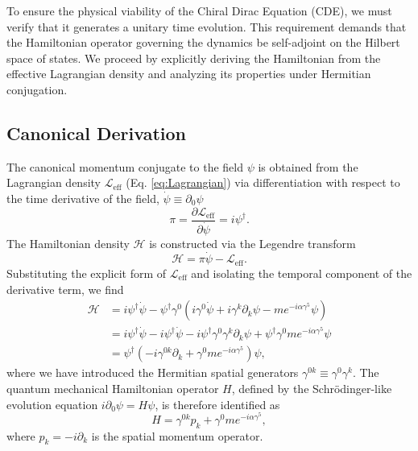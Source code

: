 To ensure the physical viability of the Chiral Dirac Equation (CDE), we must verify
that it generates a unitary time evolution. This requirement demands that the
Hamiltonian operator governing the dynamics be self-adjoint on the Hilbert space
of states. We proceed by explicitly deriving the Hamiltonian from the effective
Lagrangian density and analyzing its properties under Hermitian conjugation.

\subsection{Canonical Derivation}

The canonical momentum conjugate to the field $\psi$ is obtained from the
Lagrangian density $\mathcal{L}_{\text{eff}}$ (Eq. \ref{eq:Lagrangian}) via
differentiation with respect to the time derivative of the field, $\dot{\psi}
\equiv \partial_0 \psi$
\begin{equation}
	\pi = \frac{\partial \mathcal{L}_{\text{eff}}}{\partial \dot{\psi}} =
	i \psi^\dagger.
\end{equation}
The Hamiltonian density $\mathcal{H}$ is constructed via the Legendre transform
\begin{equation}
	\mathcal{H} = \pi \dot{\psi} - \mathcal{L}_{\text{eff}}.
\end{equation}
Substituting the explicit form of $\mathcal{L}_{\text{eff}}$ and isolating the
temporal component of the derivative term, we find
\begin{align}
	\mathcal{H} &= i \psi^\dagger \dot{\psi} - \psi^\dagger \gamma^0
	(i \gamma^0 \dot{\psi} + i \gamma^k \partial_k \psi - m e^{-i \alpha \gamma^5} \psi)
	\nonumber \\
							&= i \psi^\dagger \dot{\psi} - i \psi^\dagger \dot{\psi} - i \psi^\dagger \gamma^0
							\gamma^k \partial_k \psi + \psi^\dagger \gamma^0 m e^{-i \alpha \gamma^5} \psi
							\nonumber \\
							&= \psi^\dagger \left( -i \gamma^{0k} \partial_k + \gamma^0 m e^{-i \alpha \gamma^5}
							\right) \psi,
\end{align}
where we have introduced the Hermitian spatial generators $\gamma^{0k} \equiv
\gamma^0 \gamma^k$. The quantum mechanical Hamiltonian operator $H$, defined by
the Schrödinger-like evolution equation $i \partial_0 \psi = H \psi$, is
therefore identified as
\begin{equation}
	H = \gamma^{0k} p_k + \gamma^0 m e^{-i \alpha \gamma^5},
	\label{eq:HamiltonianOperator}
\end{equation}
where $p_k = -i \partial_k$ is the spatial momentum operator.

